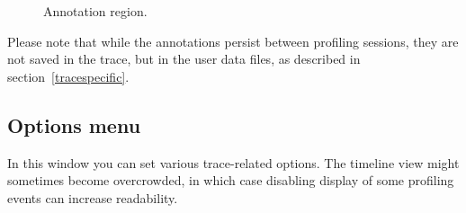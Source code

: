 \documentclass[hidelinks,titlepage,a4paper]{article}
\begin{document}
\begin{figure}[h]
\centering{}
\caption{Annotation region.}
\label{annotation}
\end{figure}

Please note that while the annotations persist between profiling sessions, they are not saved in the trace, but in the user data files, as described in section~\ref{tracespecific}.

\subsection{Options menu}
\label{options}

In this window you can set various trace-related options. The timeline view might sometimes become overcrowded, in which case disabling display of some profiling events can increase readability.
\end{document}
